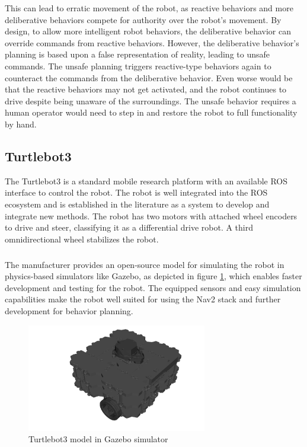 This can lead to erratic movement of the robot, as reactive behaviors and more deliberative behaviors compete for authority over the robot's movement. By design, to allow more intelligent robot behaviors, the deliberative behavior can override commands from reactive behaviors. However, the deliberative behavior's planning is based upon a false representation of reality, leading to unsafe commands. The unsafe planning triggers reactive-type behaviors again to counteract the commands from the deliberative behavior. Even worse would be that the reactive behaviors may not get activated, and the robot continues to drive despite being unaware of the surroundings. The unsafe behavior requires a human operator would need to step in and restore the robot to full functionality by hand. 



\subsection{Turtlebot3}
The Turtlebot3 is a standard mobile research platform with an available ROS interface to control the robot. The robot is well integrated into the ROS ecosystem and is established in the literature as a system to develop and integrate new methods. 
The robot has two motors with attached wheel encoders to drive and steer, classifying it as a differential drive robot. A third omnidirectional wheel stabilizes the robot. 
\subparagraph*{}
The manufacturer provides an open-source model for simulating the robot in physics-based simulators like Gazebo, as depicted in figure \ref{fig:turtlebot}, which enables faster development and testing for the robot. 
The equipped sensors and easy simulation capabilities make the robot well suited for using the Nav2 stack and further development for behavior planning. 


\begin{figure}[ht]
    \label{fig:turtlebot}
	\includegraphics[width=0.7\textwidth]{images/turtlebot_sim.png}
	\caption{Turtlebot3 model in Gazebo simulator}
\end{figure}

